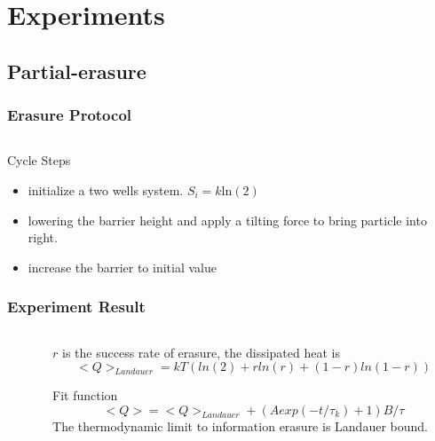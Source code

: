\documentclass[aspectratio=169,10pt]{beamer}
\begin{document}
\section{Experiments}
\subsection{Partial-erasure}
\begin{frame}
    \frametitle{Erasure Protocol}
    \begin{columns}
        \begin{column}{0.3\textwidth}
            \centering
        \end{column}
        \begin{column}{0.7\textwidth}
            \centering
        \end{column}
    \end{columns}
    \begin{block}{Cycle Steps\cite{berut2012experimental}}
        \begin{itemize}
            \item initialize a two wells system. $S_i=k\mathrm{ln(2)}$
            \item lowering the barrier height and apply a tilting force to bring particle into right.
            \item increase the barrier to initial value
        \end{itemize}
    \end{block}
\end{frame}
\begin{frame}
    \frametitle{Experiment Result}
    \begin{columns}
        \begin{column}{0.28\textwidth}
            \centering
        \end{column}
        \begin{column}{0.7\textwidth}
            $r$ is the success rate of erasure, the dissipated heat is
            \[<Q>_{Landauer}=kT(ln(2)+rln(r)+(1-r)ln(1-r))\]

            \begin{block}{Fit function}
                \[<Q>=<Q>_{Landauer}+(Aexp(-t/\tau_k)+1)B/\tau\]
                The thermodynamic limit to information erasure is Landauer bound.
            \end{block}
        \end{column}
    \end{columns}
\end{frame}
\end{document}
